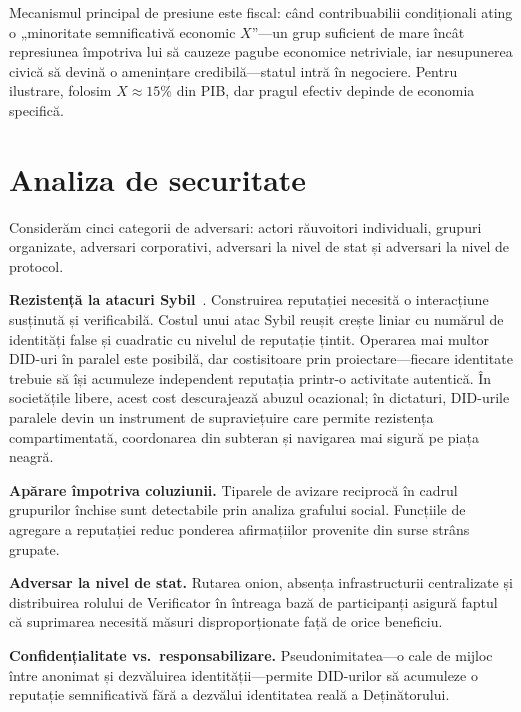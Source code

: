 \documentclass[11pt,a4paper,twocolumn]{article}
\begin{document}
Mecanismul principal de presiune este fiscal: când contribuabilii condiționali ating o „minoritate semnificativă economic $X$”---un grup suficient de mare încât represiunea împotriva lui să cauzeze pagube economice netriviale, iar nesupunerea civică să devină o amenințare credibilă---statul intră în negociere. Pentru ilustrare, folosim $X \approx 15\%$ din PIB, dar pragul efectiv depinde de economia specifică.

\section{Analiza de securitate}

Considerăm cinci categorii de adversari: actori răuvoitori individuali, grupuri organizate, adversari corporativi, adversari la nivel de stat și adversari la nivel de protocol.

\textbf{Rezistență la atacuri Sybil}~\cite{douceur2002}. Construirea reputației necesită o interacțiune susținută și verificabilă. Costul unui atac Sybil reușit crește liniar cu numărul de identități false și cuadratic cu nivelul de reputație țintit. Operarea mai multor DID-uri în paralel este posibilă, dar costisitoare prin proiectare---fiecare identitate trebuie să își acumuleze independent reputația printr-o activitate autentică. În societățile libere, acest cost descurajează abuzul ocazional; în dictaturi, DID-urile paralele devin un instrument de supraviețuire care permite rezistența compartimentată, coordonarea din subteran și navigarea mai sigură pe piața neagră.

\textbf{Apărare împotriva coluziunii.} Tiparele de avizare reciprocă în cadrul grupurilor închise sunt detectabile prin analiza grafului social. Funcțiile de agregare a reputației reduc ponderea afirmațiilor provenite din surse strâns grupate.

\textbf{Adversar la nivel de stat.} Rutarea onion, absența infrastructurii centralizate și distribuirea rolului de Verificator în întreaga bază de participanți asigură faptul că suprimarea necesită măsuri disproporționate față de orice beneficiu.

\textbf{Confidențialitate vs.\ responsabilizare.} Pseudonimitatea---o cale de mijloc între anonimat și dezvăluirea identității---permite DID-urilor să acumuleze o reputație semnificativă fără a dezvălui identitatea reală a Deținătorului.
\end{document}
